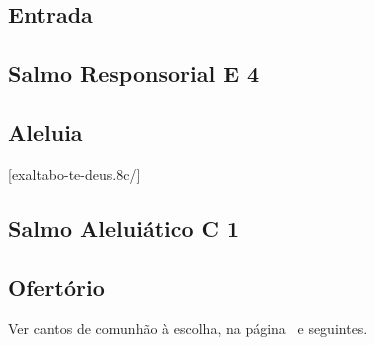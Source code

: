 
\subsection{Entrada}\label{subsection:tempus-per-annum/missa-8/introitus}

\subsection[Salmo Responsorial]{Salmo Responsorial \textmd{E 4}}\label{subsection:tempus-per-annum/missa-8/psalmus-responsorius}

\AllowPageFlush

\subsection{Aleluia}\label{subsection:tempus-per-annum/missa-8/alleluia}
[exaltabo-te-deus.8c/]

\AllowPageFlush

\subsection[Salmo Aleluiático]{Salmo Aleluiático \textmd{C 1}}\label{subsection:tempus-per-annum/missa-8/psalmus-alleluiaticus}

\AllowPageFlush

\subsection{Ofertório}\label{subsection:tempus-per-annum/missa-8/offertorium}

\begin{rubrica}
  Ver cantos de comunhão à escolha, na página~\pageref{appendix:communio-ad-libitum} e seguintes.
\end{rubrica}